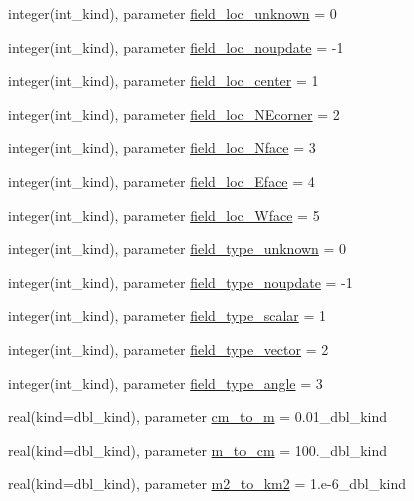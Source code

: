 \begin{DoxyCompactItemize}
\item 
integer(int\_\-kind), parameter \hyperlink{namespaceice__constants_a58c70d55a68b1df0f5ffa50c44454925}{field\_\-loc\_\-unknown} = 0
\item 
integer(int\_\-kind), parameter \hyperlink{namespaceice__constants_a369a7f2a079cc86d38882b8247aaa0b0}{field\_\-loc\_\-noupdate} = -\/1
\item 
integer(int\_\-kind), parameter \hyperlink{namespaceice__constants_a4c526a105da0fa08ad1877e55f6d60fc}{field\_\-loc\_\-center} = 1
\item 
integer(int\_\-kind), parameter \hyperlink{namespaceice__constants_a6b38e42de787f72eabe064f976338775}{field\_\-loc\_\-NEcorner} = 2
\item 
integer(int\_\-kind), parameter \hyperlink{namespaceice__constants_ac47ad33ed33a4dae49cf6e50c05efd06}{field\_\-loc\_\-Nface} = 3
\item 
integer(int\_\-kind), parameter \hyperlink{namespaceice__constants_a542746cf70d3c18a41d44c5382c4cb34}{field\_\-loc\_\-Eface} = 4
\item 
integer(int\_\-kind), parameter \hyperlink{namespaceice__constants_ad97a4cfce80f3acb3657f497e459e6fb}{field\_\-loc\_\-Wface} = 5
\item 
integer(int\_\-kind), parameter \hyperlink{namespaceice__constants_ab690b4d66447609212d302c0fe485dda}{field\_\-type\_\-unknown} = 0
\item 
integer(int\_\-kind), parameter \hyperlink{namespaceice__constants_a113ccc2c17076b3fce46d2a4d7f2b1c2}{field\_\-type\_\-noupdate} = -\/1
\item 
integer(int\_\-kind), parameter \hyperlink{namespaceice__constants_a98992b4bfb499ea1f7a0f6037c17a100}{field\_\-type\_\-scalar} = 1
\item 
integer(int\_\-kind), parameter \hyperlink{namespaceice__constants_abd07ef2bb17edc4fea6e1fc901ab89f8}{field\_\-type\_\-vector} = 2
\item 
integer(int\_\-kind), parameter \hyperlink{namespaceice__constants_a3986aa54de6be9d32605fc28334dff02}{field\_\-type\_\-angle} = 3
\item 
real(kind=dbl\_\-kind), parameter \hyperlink{namespaceice__constants_ae6404df4cdf687bafaf228da3b7b4354}{cm\_\-to\_\-m} = 0.01\_\-dbl\_\-kind
\item 
real(kind=dbl\_\-kind), parameter \hyperlink{namespaceice__constants_a3f01424bceae75ecd2f26cdf208a89f6}{m\_\-to\_\-cm} = 100.\_\-dbl\_\-kind
\item 
real(kind=dbl\_\-kind), parameter \hyperlink{namespaceice__constants_adea1a32826f6ac5693ff2cff66098aef}{m2\_\-to\_\-km2} = 1.e-\/6\_\-dbl\_\-kind

\end{DoxyCompactItemize}
